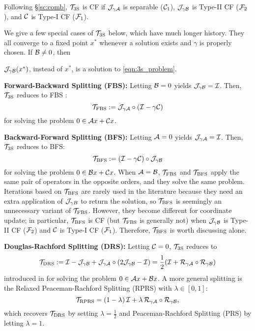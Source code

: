 Following \S\ref{sc:comb},  ${{\mathcal{T}}_{\mathrm{3S}}}$ {is CF if } ${\mathcal{J}}_{\gamma {\mathcal{A}}}$ is separable (${\mathcal{C}}_1$), ${\mathcal{J}}_{\gamma {\mathcal{B}}}$ is Type-II CF (${\mathcal{F}}_2$), and ${\mathcal{C}}$ is Type-I CF (${\mathcal{F}}_1$). %

We give a few special cases of ${{\mathcal{T}}_{\mathrm{3S}}}$ below, which have much longer history. They all converge to a fixed point $x^*$ whenever a solution exists and $\gamma$ is properly chosen. If ${\mathcal{B}}\neq 0$, then {${\mathcal{J}}_{\gamma {\mathcal{B}}}(x^*)$, instead of $x^*$, is a solution to \eqref{eqn:3s_problem}.

 \textbf{Forward-Backward Splitting (FBS):} Letting ${\mathcal{B}}=0$ yields ${\mathcal{J}}_{\gamma{\mathcal{B}}}={\mathcal{I}}$. Then, ${{\mathcal{T}}_{\mathrm{3S}}}$ reduces to FBS \cite{passty1979FBS}:
 \begin{equation}\label{eq:FBS}
 \TFBS:=\cJ_{\gamma \cA}\circ(\cI-\gamma \cC)
 \end{equation}
 for solving the problem $0\in{\mathcal{A}} x+{\mathcal{C}} x$.

\textbf{Backward-Forward Splitting (BFS):} Letting ${\mathcal{A}}=0$ yields ${\mathcal{J}}_{\gamma{\mathcal{A}}}={\mathcal{I}}$. Then, ${{\mathcal{T}}_{\mathrm{3S}}}$ reduces to BFS:
  \begin{equation}\label{eq:BFS}\TBFS:=(\cI-\gamma \cC)\circ \cJ_{\gamma \cB}
  \end{equation}
for solving the problem $0\in{\mathcal{B}} x+{\mathcal{C}} x$. When ${\mathcal{A}}={\mathcal{B}}$, ${{\mathcal{T}}_{\mathrm{FBS}}}$ and ${{\mathcal{T}}_{\mathrm{BFS}}}$ apply the same pair of operators in the opposite orders, and they solve the same problem. Iterations based on ${{\mathcal{T}}_{\mathrm{BFS}}}$ are rarely used in the literature because they  need an extra application of ${\mathcal{J}}_{\gamma B}$ to return the solution, so ${{\mathcal{T}}_{\mathrm{BFS}}}$ is seemingly an unnecessary variant of ${{\mathcal{T}}_{\mathrm{FBS}}}$. However, they become  different for coordinate update; in particular, ${{\mathcal{T}}_{\mathrm{BFS}}}$ is CF (but ${{\mathcal{T}}_{\mathrm{FBS}}}$ is generally not) when ${\mathcal{J}}_{\gamma {\mathcal{B}}}$ is Type-II CF (${\mathcal{F}}_2$) and ${\mathcal{C}}$ is Type-I CF (${\mathcal{F}}_1$). Therefore, ${{\mathcal{T}}_{\mathrm{BFS}}}$ is worth discussing alone.

\textbf{Douglas-Rachford Splitting (DRS):} Letting ${\mathcal{C}}=0$, ${{\mathcal{T}}_{\mathrm{3S}}}$ reduces to
  \begin{equation}\label{eq:DRS}\TDRS:=\cI-\cJ_{\gamma \cB}+\cJ_{\gamma\cA}\circ(2\cJ_{\gamma \cB}-\cI)=\frac{1}{2}(\cI+\cR_{\gamma\cA}\circ \cR_{\gamma\cB})
  \end{equation}
introduced in \cite{douglas1956DRS} for solving the problem $0\in{\mathcal{A}} x+{\mathcal{B}} x$. A more general splitting is the  Relaxed Peaceman-Rachford Splitting (RPRS) with $\lambda\in[0,1]$:
 \begin{equation}
\cT_{\text{RPRS}} = (1 - \lambda)\, \cI + \lambda \, \cR_{\gamma \cA} \circ \cR_{\gamma \cB},
\end{equation}
which recovers ${{\mathcal{T}}_{\mathrm{DRS}}}$ by setting $\lambda=\frac{1}{2}$ and Peaceman-Rachford Splitting (PRS) \cite{peaceman1955PRS} by letting $\lambda=1$.

}
